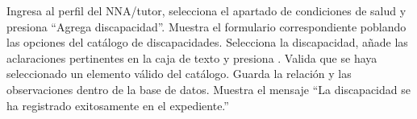 \begin{UCtrayectoria}
	\UCpaso[\UCactor] Ingresa al perfil del NNA/tutor, selecciona el apartado de condiciones de salud y presiona ``Agrega discapacidad''.
	\UCpaso Muestra el formulario correspondiente poblando las opciones del catálogo de discapacidades.
	\UCpaso[\UCactor] \label{CU-34.ingresaDatos} Selecciona la discapacidad, añade las aclaraciones pertinentes en la caja de texto y presiona .
	\UCpaso Valida que se haya seleccionado un elemento válido del catálogo. 
	\UCpaso Guarda la relación y las observaciones dentro de la base de datos.
	\UCpaso Muestra el mensaje ``La discapacidad se ha registrado exitosamente en el expediente.''
\end{UCtrayectoria}



